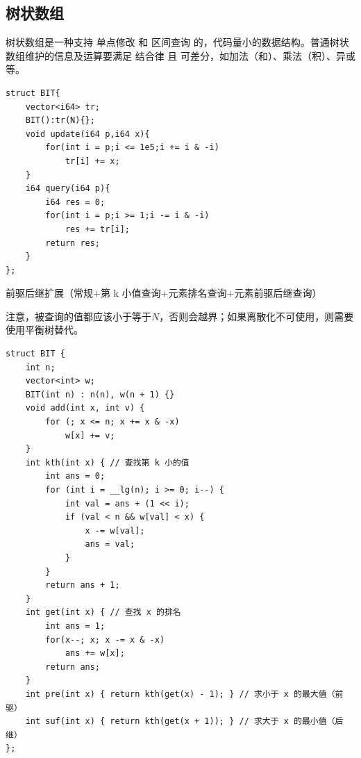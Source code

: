 \subsection{树状数组}
树状数组是一种支持 单点修改 和 区间查询 的，代码量小的数据结构。普通树状数组维护的信息及运算要满足 结合律 且 可差分，如加法（和）、乘法（积）、异或等。
\begin{lstlisting}[caption={}]
struct BIT{
    vector<i64> tr;
    BIT():tr(N){};
    void update(i64 p,i64 x){
        for(int i = p;i <= 1e5;i += i & -i)
            tr[i] += x;
    }
    i64 query(i64 p){
        i64 res = 0;
        for(int i = p;i >= 1;i -= i & -i)
            res += tr[i];
        return res;
    }
};
\end{lstlisting}
前驱后继扩展（常规+第 k 小值查询+元素排名查询+元素前驱后继查询）

注意，被查询的值都应该小于等于$N$，否则会越界；如果离散化不可使用，则需要使用平衡树替代。
\begin{lstlisting}[caption={}]
struct BIT {
    int n;
    vector<int> w;
    BIT(int n) : n(n), w(n + 1) {}
    void add(int x, int v) {
        for (; x <= n; x += x & -x)
            w[x] += v;
    }
    int kth(int x) { // 查找第 k 小的值
        int ans = 0;
        for (int i = __lg(n); i >= 0; i--) {
            int val = ans + (1 << i);
            if (val < n && w[val] < x) {
                x -= w[val];
                ans = val;
            }
        }
        return ans + 1;
    }
    int get(int x) { // 查找 x 的排名
        int ans = 1;
        for(x--; x; x -= x & -x)
            ans += w[x];
        return ans;
    }
    int pre(int x) { return kth(get(x) - 1); } // 求小于 x 的最大值（前驱）
    int suf(int x) { return kth(get(x + 1)); } // 求大于 x 的最小值（后继）
};
\end{lstlisting}

